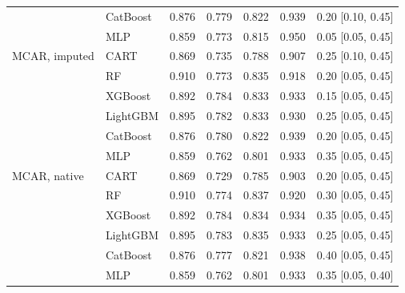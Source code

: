 \documentclass[pdflatex,sn-mathphys]{sn-jnl}
\theoremstyle{thmstyleone}
\begin{document}
\begin{table}[htbp]
\begin{tabular}{@{}llrrrrl@{}}
 & CatBoost & 0.876 & 0.779 & 0.822 & 0.939 & 0.20 [0.10, 0.45] \\
 & MLP & 0.859 & 0.773 & 0.815 & 0.950 & 0.05 [0.05, 0.45] \\
\midrule
MCAR, imputed & CART & 0.869 & 0.735 & 0.788 & 0.907 & 0.25 [0.10, 0.45] \\
 & RF & 0.910 & 0.773 & 0.835 & 0.918 & 0.20 [0.05, 0.45] \\
 & XGBoost & 0.892 & 0.784 & 0.833 & 0.933 & 0.15 [0.05, 0.45] \\
 & LightGBM & 0.895 & 0.782 & 0.833 & 0.930 & 0.25 [0.05, 0.45] \\
 & CatBoost & 0.876 & 0.780 & 0.822 & 0.939 & 0.20 [0.05, 0.45] \\
 & MLP & 0.859 & 0.762 & 0.801 & 0.933 & 0.35 [0.05, 0.45] \\
\midrule
MCAR, native & CART & 0.869 & 0.729 & 0.785 & 0.903 & 0.20 [0.05, 0.45] \\
 & RF & 0.910 & 0.774 & 0.837 & 0.920 & 0.30 [0.05, 0.45] \\
 & XGBoost & 0.892 & 0.784 & 0.834 & 0.934 & 0.35 [0.05, 0.45] \\
 & LightGBM & 0.895 & 0.783 & 0.835 & 0.933 & 0.25 [0.05, 0.45] \\
 & CatBoost & 0.876 & 0.777 & 0.821 & 0.938 & 0.40 [0.05, 0.45] \\
 & MLP & 0.859 & 0.762 & 0.801 & 0.933 & 0.35 [0.05, 0.40] \\
\bottomrule
\end{tabular}
\end{table}
\end{document}

